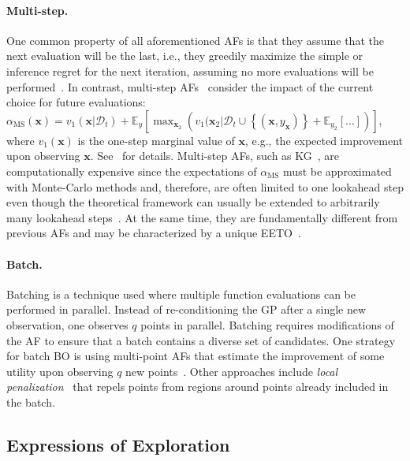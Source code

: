 \paragraph{Multi-step.}
One common property of all aforementioned \acp{AF} is that they assume that the next evaluation will be the last, i.e., they greedily maximize the simple or inference regret for the next iteration, assuming no more evaluations will be performed~\citep{wang2017max}.
In contrast, multi-step \acp{AF}~\citep{ginsbourger2010towards,wu2019practical,jiang2020efficient} consider the impact of the current choice for future evaluations: $\alpha_{\text{MS}}(\bm{x}) = v_1(\bm{x}|\mathcal{D}_t)+\mathbb{E}_y\left[\max_{\bm{x}_2}\left(v_1(\bm{x}_2\vert\mathcal{D}_t\cup\left\{(\bm{x},y_{\bm x})\right\}+\mathbb{E}_{y_2}\left[\ldots\right]\right)\right]$,
where $v_1(\bm{x})$ is the one-step marginal value of $\bm{x}$, e.g., the expected improvement upon observing $\bm{x}$.
See~\cite{jiang2020efficient} for details.
Multi-step \acp{AF}, such as \ac{KG}~\citep{frazier2009knowledge}, are computationally expensive since the expectations of $\alpha_{\text{MS}}$ must be approximated with Monte-Carlo methods and, therefore, are often limited to one lookahead step even though the theoretical framework can usually be extended to arbitrarily many lookahead steps~\citep{jiang2020efficient}.
At the same time, they are fundamentally different from previous \acp{AF} and may be characterized by a unique \ac{EETO}~\citep{wu2019practical}.

\paragraph{Batch.}

Batching is a technique used where multiple function evaluations can be performed in parallel.
Instead of re-conditioning the \ac{GP} after a single new observation, one observes $q$ points in parallel.
Batching requires modifications of the \ac{AF} to ensure that a batch contains a diverse set of candidates.
One strategy for batch \ac{BO} is using multi-point \acp{AF} that estimate the improvement of some utility upon observing $q$ new points~\citep{wang2020parallel}.
Other approaches include \emph{local penalization}~\citep{gonzalez2016batch} that repels points from regions around points already included in the batch.

\subsection{Expressions of Exploration}

